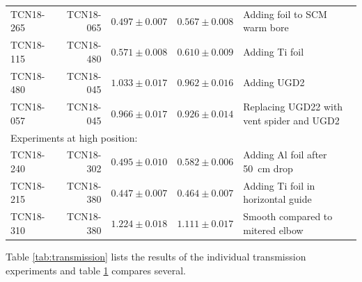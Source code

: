 \documentclass[10pt,letterpaper]{article}
\begin{document}
\begin{table}
{\begin{tabular}{l r r r p{}}
TCN18-265 & TCN18-065 & $0.497 \pm 0.007$ & $0.567 \pm 0.008$ & Adding foil to SCM warm bore \\
TCN18-115 & TCN18-480 & $0.571 \pm 0.008$ & $0.610 \pm 0.009$ & Adding Ti foil \\
TCN18-480 & TCN18-045 & $1.033 \pm 0.017$ & \sout{$0.962 \pm 0.016$} & Adding UGD2 \\
TCN18-057 & TCN18-045 & $0.966 \pm 0.017$ & \sout{$0.926 \pm 0.014$} & Replacing UGD22 with vent spider and UGD2 \\
\midrule
\multicolumn{4}{l}{Experiments at high position:} \\
TCN18-240 & TCN18-302 & $0.495 \pm 0.010$ & $0.582 \pm 0.006$ & Adding Al foil after \SI{50}{\centi\meter} drop \\
TCN18-215 & TCN18-380 & $0.447 \pm 0.007$ & $0.464 \pm 0.007$ & Adding Ti foil in horizontal guide \\
TCN18-310 & TCN18-380 & $1.224 \pm 0.018$ & $1.111 \pm 0.017$ & Smooth compared to mitered elbow\\
\bottomrule
\end{tabular}
}
\label{tab:transmission_comparison}
\end{table}

Table \ref{tab:transmission} lists the results of the individual transmission experiments and table \ref{tab:transmission_comparison} compares several.
\end{document}
